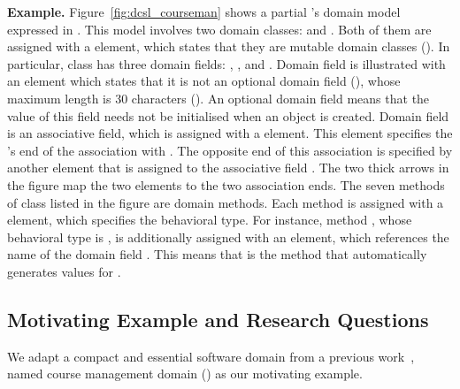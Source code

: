 \noindent \textbf{Example.} Figure~\ref{fig:dcsl_courseman} shows a partial \courseman's domain model expressed in \dcsl. This model involves two domain classes:  and . 
Both of them are assigned with a  element, which states that they are mutable domain classes (). In particular, class  has three domain fields: , , and . Domain field  is illustrated with an  element which states that it is not an optional domain field (), whose maximum length is 30 characters (). An optional domain field means that the value of this field needs not be initialised when an object is created. Domain field  is an associative field, which is assigned with a  element. This element specifies the 's end of the association with . The opposite end of this association is specified by another  element that is assigned to the associative field . The two thick arrows in the figure map the two  elements to the two association ends. 
%
The seven methods of class  listed in the figure are domain methods. Each method is assigned with a  element, which specifies the behavioral type. For instance, method , whose behavioral type is , is additionally assigned with an  element, which references the name of the domain field . This means that  is the method that automatically generates values for .

\subsection{Motivating Example and Research Questions} 
\label{sect:bg-courseman-eg}

We adapt a compact and essential software domain from a previous work~\cite{le_domain_2018}, named course management domain (\courseman) as our motivating example. %


